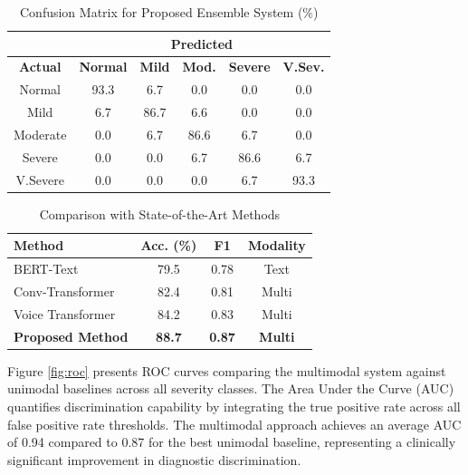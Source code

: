 \documentclass[conference]{IEEEtran}
\begin{document}
\begin{table}[htbp]
\caption{Confusion Matrix for Proposed Ensemble System (\%)}
\begin{center}
\begin{tabular}{|c|c|c|c|c|c|}
\hline
\multicolumn{1}{|c|}{\textbf{}} & \multicolumn{5}{c|}{\textbf{Predicted}} \\
\hline
\textbf{Actual} & \textbf{Normal} & \textbf{Mild} & \textbf{Mod.} & \textbf{Severe} & \textbf{V.Sev.} \\
\hline
Normal & 93.3 & 6.7 & 0.0 & 0.0 & 0.0 \\
Mild & 6.7 & 86.7 & 6.6 & 0.0 & 0.0 \\
Moderate & 0.0 & 6.7 & 86.6 & 6.7 & 0.0 \\
Severe & 0.0 & 0.0 & 6.7 & 86.6 & 6.7 \\
V.Severe & 0.0 & 0.0 & 0.0 & 6.7 & 93.3 \\
\hline
\end{tabular}
\end{center}
\label{tab:confusion}
\end{table}

\begin{table}[htbp]
\caption{Comparison with State-of-the-Art Methods}
\begin{center}
\begin{tabular}{|l|c|c|c|}
\hline
\textbf{Method} & \textbf{Acc. (\%)} & \textbf{F1} & \textbf{Modality} \\
\hline
BERT-Text \cite{devlin2019} & 79.5 & 0.78 & Text \\
Conv-Transformer \cite{rajendran2024conv} & 82.4 & 0.81 & Multi \\
Voice Transformer \cite{ranjith2024gtso} & 84.2 & 0.83 & Multi \\
\textbf{Proposed Method} & \textbf{88.7} & \textbf{0.87} & \textbf{Multi} \\
\hline
\end{tabular}
\end{center}
\label{tab:sota}
\end{table}

Figure \ref{fig:roc} presents ROC curves comparing the multimodal system against unimodal baselines across all severity classes. The Area Under the Curve (AUC) quantifies discrimination capability by integrating the true positive rate across all false positive rate thresholds. The multimodal approach achieves an average AUC of 0.94 compared to 0.87 for the best unimodal baseline, representing a clinically significant improvement in diagnostic discrimination.
\end{document}
